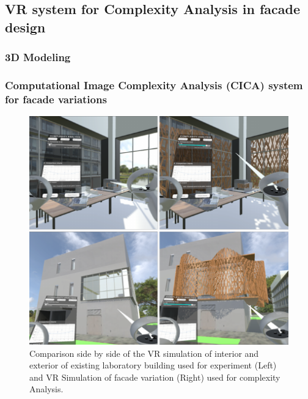 \documentclass[final,5p,times]{elsarticle}%
\begin{document}
\begin{linenumbers}
    \subsection{VR system for Complexity Analysis in facade design}
    \label{subsec:VRsystemDevelopment}
    

        \subsubsection{3D Modeling}
        \label{subsubsec:Modeling}
        

        \subsubsection{Computational Image Complexity Analysis (CICA) system for facade variations}
        \label{subsubsec:CICAforFacades}
        

            \begin{figure}[htb]
                \centering
                \includegraphics[width= \linewidth]{Images/VRInteriorExterior}
                \caption{Comparison side by side of the VR simulation of interior and exterior of existing laboratory building used for experiment (Left) and VR Simulation of facade variation (Right) used for complexity Analysis.}
                \label{fig:VRInteriorExterior}
            \end{figure}


\end{linenumbers}
\end{document}

